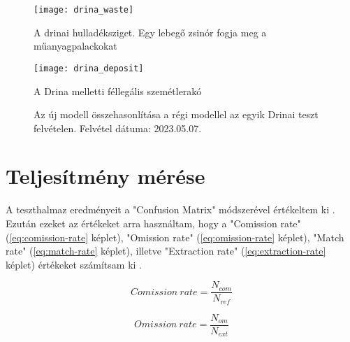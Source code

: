 \begin{figure}[H]
	\centering
	\texttt{[image: drina\_waste]}
	\caption{A drinai hulladéksziget. Egy lebegő zsinór fogja meg a műanyagpalackokat \cite{euronews2024}}
    \label{fig:drina-floating-waste}
\end{figure}

\begin{figure}[H]
	\centering
	\texttt{[image: drina\_deposit]}
	\caption{A Drina melletti féllegális szemétlerakó \cite{petkupa2024}}
    \label{fig:drina-deposit}
\end{figure}

\begin{figure}[H]
	\centering
	\hspace{5pt}
	\hspace{5pt}
	\caption{Az új modell összehasonlítása a régi modellel az egyik Drinai teszt felvételen. Felvétel dátuma: 2023.05.07.}
	\label{fig:old-vs-new}
\end{figure}

\section{Teljesítmény mérése}

A teszthalmaz eredményeit a "Confusion Matrix" módszerével értékeltem ki \cite{CONGALTON199135}. Ezután ezeket az értékeket arra használtam, hogy a "Comission rate" (\ref{eq:comission-rate} képlet), "Omission rate" (\ref{eq:omission-rate} képlet), "Match rate" (\ref{eq:match-rate} képlet), illetve "Extraction rate" (\ref{eq:extraction-rate} képlet) értékeket számítsam ki \cite{Fekete2021}.

\begin{equation}\label{eq:comission-rate}
    Comission \ rate = \frac{N_{com}}{N_{ref}}
\end{equation}

\begin{equation}\label{eq:omission-rate}
    Omission \ rate = \frac{N_{om}}{N_{ext}}
\end{equation}

